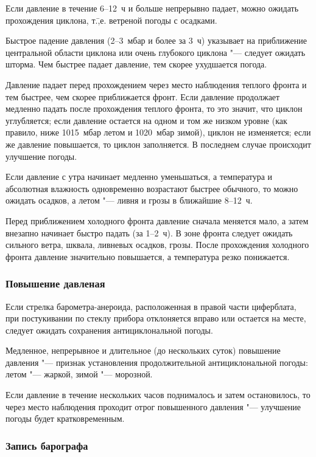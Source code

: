  Если давление в течение 6--12~ч и больше непрерывно падает, можно
ожидать прохождения циклона, т.\=,е. ветреной погоды с осадками.

 Быстрое падение давления (2--3~мбар и более за 3~ч)
указывает на приближение центральной области циклона или очень
глубокого циклона "--- следует ожидать шторма. Чем быстрее падает
давление, тем скорее ухудшается погода.

 Давление падает перед прохождением через место наблюдения
теплого фронта и тем быстрее, чем скорее приближается фронт. Если
давление продолжает медленно падать после прохождения теплого фронта,
то это значит, что циклон углубляется; если давление остается на одном
и том же низком уровне (как правило, ниже 1015~мбар летом и 1020~мбар
зимой), циклон не изменяется; если же давление повышается, то циклон
заполняется. В последнем случае происходит улучшение погоды.

 Если давление с утра начинает медленно уменьшаться, а
температура и абсолютная влажность одновременно возрастают быстрее
обычного, то можно ожидать осадков, а летом "--- ливня и грозы в
ближайшие 8--12~ч.

 Перед приближением холодного фронта давление сначала меняется
мало, а затем внезапно начинает быстро падать (за 1--2~ч). В зоне
фронта следует ожидать сильного ветра, шквала, ливневых осадков,
грозы. После прохождения холодного фронта давление значительно
повышается, а температура резко понижается.

\subsubsection{Повышение давленая}

 Если стрелка барометра-анероида, расположенная в правой части
циферблата, при постукивании по стеклу прибора отклоняется вправо или
остается на месте, следует ожидать сохранения антициклональной погоды.

 Медленное, непрерывное и длительное (до нескольких суток)
повышение давления "--- признак установления продолжительной
антициклональной погоды: летом "--- жаркой, зимой "--- морозной.

 Если давление в течение нескольких часов поднималось и затем
остановилось, то через место наблюдения проходит отрог повышенного
давления "--- улучшение погоды будет кратковременным.

\subsubsection{Запись барографа}


